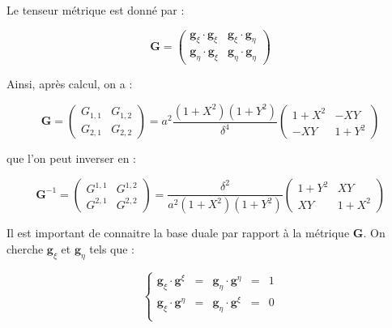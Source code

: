 Le tenseur métrique est donné par :

\begin{equation}
\mathbf{G} = \begin{pmatrix}
\mathbf{g}_{\xi} \cdot \mathbf{g}_{\xi} & \mathbf{g}_{\xi} \cdot \mathbf{g}_{\eta} \\
\mathbf{g}_{\eta} \cdot \mathbf{g}_{\xi} & \mathbf{g}_{\eta} \cdot \mathbf{g}_{\eta}
\end{pmatrix}
\end{equation}

Ainsi, après calcul, on a :

\begin{equation}
\mathbf{G} = \begin{pmatrix}
G_{1,1} & G_{1,2} \\ G_{2,1} & G_{2,2}
\end{pmatrix} = a^2 \dfrac{(1+X^2)(1+Y^2)}{\delta^4} \begin{pmatrix}
1+X^2 & -XY \\ -XY & 1+Y^2
\end{pmatrix}
\end{equation}

que l'on peut inverser en :

\begin{equation}
\mathbf{G}^{-1} = \begin{pmatrix}
G^{1,1} & G^{1,2} \\ G^{2,1} & G^{2,2}
\end{pmatrix} = \dfrac{\delta^2}{a^2 (1+X^2)(1+Y^2)} \begin{pmatrix}
1+Y^2 & XY \\ XY & 1+X^2
\end{pmatrix}
\end{equation}

Il est important de connaitre la base duale par rapport à la métrique $\mathbf{G}$. On cherche $\mathbf{g}_{\xi}$ et $\mathbf{g}_{\eta}$ tels que :

\begin{equation}
\left\lbrace
\begin{array}{rcccl}
\mathbf{g}_{\xi} \cdot \mathbf{g}^{\xi} & = & \mathbf{g}_{\eta} \cdot \mathbf{g}^{\eta} & = & 1 \\
\mathbf{g}_{\xi} \cdot \mathbf{g}^{\eta} & = & \mathbf{g}_{\eta} \cdot \mathbf{g}^{\xi} & = & 0 \\
\end{array}
\right.
\end{equation}

